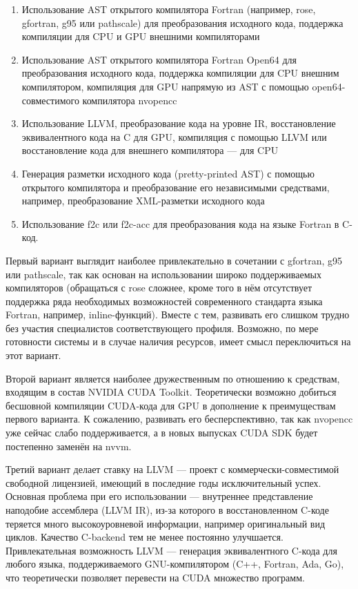 \documentclass[a4,12pt]{report}
\begin{document}
\begin{enumerate}
\item Использование AST открытого компилятора Fortran (например, rose, gfortran, g95 или pathscale) для преобразования исходного кода, поддержка компиляции для CPU и GPU внешними компиляторами
\item Использование AST открытого компилятора Fortran Open64 для преобразования исходного кода, поддержка компиляции для CPU внешним компилятором, компиляция для GPU напрямую из AST с помощью open64-совместимого компилятора nvopencc
\item Использование LLVM, преобразование кода на уровне IR, восстановление эквивалентного кода на C для GPU, компиляция с помощью LLVM или восстановление кода для внешнего компилятора --- для CPU
\item Генерация разметки исходного кода (pretty-printed AST) с помощью открытого компилятора и преобразование его независимыми средствами, например, преобразование XML-разметки исходного кода
\item Использование f2c или f2c-acc для преобразования кода на языке Fortran в C-код.
\end{enumerate}

Первый вариант выглядит наиболее привлекательно в сочетании с gfortran, g95 или pathscale, так как основан на использовании широко поддерживаемых компиляторов (обращаться с rose сложнее, кроме того в нём отсутствует поддержка ряда необходимых возможностей современного стандарта языка Fortran, например, inline-функций). Вместе с тем, развивать его слишком трудно без участия специалистов соответствующего профиля. Возможно, по мере готовности системы и в случае наличия ресурсов, имеет смысл переключиться на этот вариант.


Второй вариант является наиболее дружественным по отношению к средствам, входящим в состав NVIDIA CUDA Toolkit. Теоретически возможно добиться бесшовной компиляции CUDA-кода для GPU в дополнение к преимуществам первого варианта. К сожалению, развивать его бесперспективно, так как nvopencc уже сейчас слабо поддерживается, а в новых выпусках CUDA SDK будет постепенно заменён на nvvm.


Третий вариант делает ставку на LLVM --- проект с коммерчески-совместимой свободной лицензией, имеющий в последние годы исключительный успех. Основная проблема при его использовании --- внутреннее представление наподобие ассемблера (LLVM IR), из-за которого в восстановленном C-коде теряется много высокоуровневой информации, например оригинальный вид циклов. Качество C-backend тем не менее постоянно улучшается. Привлекательная возможность LLVM --- генерация эквивалентного C-кода для любого языка, поддерживаемого GNU-компилятором (C++, Fortran, Ada, Go), что теоретически позволяет перевести на CUDA множество программ.
\end{document}
